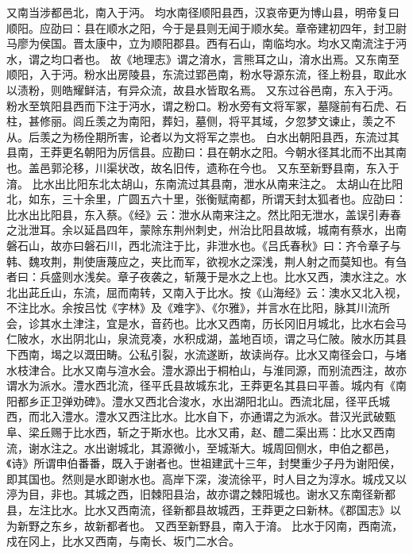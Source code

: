 \documentclass[12pt,UTF8]{ctexbook}
\begin{document}
又南当涉都邑北，南入于沔。
均水南径顺阳县西，汉哀帝更为博山县，明帝复曰顺阳。应劭曰：县在顺水之阳，今于是县则无闻于顺水矣。章帝建初四年，封卫尉马廖为侯国。晋太康中，立为顺阳郡县。西有石山，南临均水。均水又南流注于沔水，谓之均口者也。
故《地理志》谓之淯水，言熊耳之山，淯水出焉。又东南至顺阳，入于沔。粉水出房陵县，东流过郢邑南，粉水导源东流，径上粉县，取此水以渍粉，则皓耀鲜洁，有异众流，故县水皆取名焉。
又东过谷邑南，东入于沔。
粉水至筑阳县西而下注于沔水，谓之粉口。粉水旁有文将军冢，墓隧前有石虎、石柱，甚修丽。闾丘羡之为南阳，葬妇，墓侧，将平其域，夕忽梦文谏止，羡之不从。后羡之为杨佺期所害，论者以为文将军之祟也。
白水出朝阳县西，东流过其县南，王莽更名朝阳为厉信县。应勘曰：县在朝水之阳。今朝水径其北而不出其南也。盖邑郭沦移，川渠状改，故名旧传，遗称在今也。
又东至新野县南，东入于淯。
比水出比阳东北太胡山，东南流过其县南，泄水从南来注之。
太胡山在比阳北，如东，三十余里，广圆五六十里，张衡赋南都，所谓天封太狐者也。应劭曰：比水出比阳县，东入蔡。《经》云：泄水从南来注之。然比阳无泄水，盖误引寿春之沘泄耳。余以延昌四年，蒙除东荆州刺史，州治比阳县故城，城南有蔡水，出南磐石山，故亦曰磐石川，西北流注于比，非泄水也。《吕氏春秋》曰：齐令章子与韩、魏攻荆，荆使唐蔑应之，夹比而军，欲视水之深浅，荆人射之而莫知也。有刍者曰：兵盛则水浅矣。章子夜袭之，斩蔑于是水之上也。比水又西，澳水注之。水北出茈丘山，东流，屈而南转，又南入于比水。按《山海经》云：澳水又北入视，不注比水。余按吕忱《字林》及《难字》、《尔雅》，并言水在比阳，脉其川流所会，诊其水土津注，宜是水，音药也。比水又西南，历长冈旧月城北，比水右会马仁陂水，水出阴北山，泉流竞凑，水积成湖，盖地百顷，谓之马仁陂。陂水历其县下西南，堨之以溉田畴。公私引裂，水流遂断，故读尚存。比水又南径会口，与堵水枝津合。比水又南与渲水会。澧水源出于桐柏山，与淮同源，而别流西注，故亦谓水为派水。澧水西北流，径平氏县故城东北，王莽更名其县曰平善。城内有《南阳都乡正卫弹劝碑》。澧水又西北合浚水，水出湖阳北山。西流北屈，径平氏城西，而北入澧水。澧水又西注比水。比水自下，亦通谓之为派水。昔汉光武破甄阜、梁丘赐于比水西，斩之于斯水也。比水又甫，赵、醴二渠出焉：比水又西南流，谢水注之。水出谢城北，其源微小，至城渐大。城周回侧水，申伯之都邑，《诗》所谓申伯番番，既入于谢者也。世祖建武十三年，封樊重少子丹为谢阳侯，即其国也。然则是水即谢水也。高岸下深，浚流徐平，时人目之为淳水。城戍又以渟为目，非也。其城之西，旧棘阳县治，故亦谓之棘阳城也。谢水又东南径新都县，左注比水。比水又西南流，径新都县故城西，王莽更之曰新林。《郡国志》以为新野之东乡，故新都者也。
又西至新野县，南入于淯。
比水于冈南，西南流，戍在冈上，比水又西南，与南长、坂门二水合。
\end{document}
